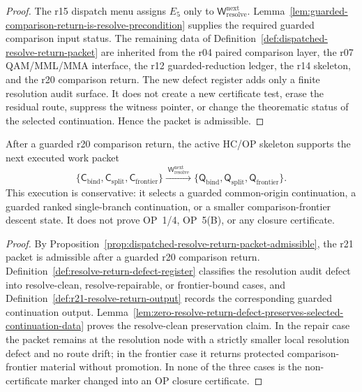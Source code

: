 \begin{proof}
The r15 dispatch menu assigns \(E_5\) only to \(\mathsf W_{\mathrm{resolve}}^{\mathrm{next}}\).  Lemma~\ref{lem:guarded-comparison-return-is-resolve-precondition} supplies the required guarded comparison input status.  The remaining data of Definition~\ref{def:dispatched-resolve-return-packet} are inherited from the r04 paired comparison layer, the r07 QAM/MML/MMA interface, the r12 guarded-reduction ledger, the r14 skeleton, and the r20 comparison return.  The new defect register adds only a finite resolution audit surface.  It does not create a new certificate test, erase the residual route, suppress the witness pointer, or change the theorematic status of the selected continuation.  Hence the packet is admissible.
\end{proof}

\begin{theorem}
\label{thm:first-dispatched-resolve-return-packet}
After a guarded r20 comparison return, the active HC/OP skeleton supports the next executed work packet
\[
  \{\mathsf C_{\mathrm{bind}},\mathsf C_{\mathrm{split}},\mathsf C_{\mathrm{frontier}}\}
  \xrightarrow{\;\mathsf W_{\mathrm{resolve}}^{\mathrm{next}}\;}
  \{\mathsf Q_{\mathrm{bind}},\mathsf Q_{\mathrm{split}},\mathsf Q_{\mathrm{frontier}}\}.
\]
This execution is conservative: it selects a guarded common-origin continuation, a guarded ranked single-branch continuation, or a smaller comparison-frontier descent state.  It does not prove OP~1/4, OP~5(B), or any closure certificate.
\end{theorem}

\begin{proof}
By Proposition~\ref{prop:dispatched-resolve-return-packet-admissible}, the r21 packet is admissible after a guarded r20 comparison return.  Definition~\ref{def:resolve-return-defect-register} classifies the resolution audit defect into resolve-clean, resolve-repairable, or frontier-bound cases, and Definition~\ref{def:r21-resolve-return-output} records the corresponding guarded continuation output.  Lemma~\ref{lem:zero-resolve-return-defect-preserves-selected-continuation-data} proves the resolve-clean preservation claim.  In the repair case the packet remains at the resolution node with a strictly smaller local resolution defect and no route drift; in the frontier case it returns protected comparison-frontier material without promotion.  In none of the three cases is the non-certificate marker changed into an OP closure certificate.
\end{proof}

